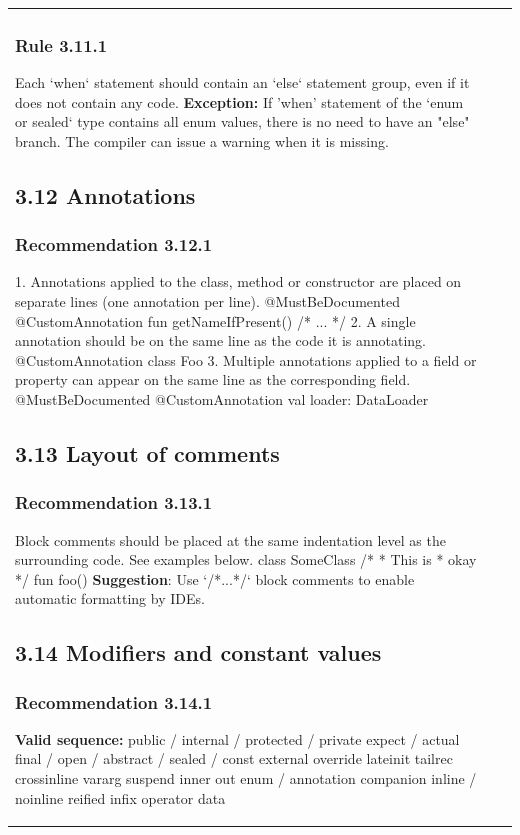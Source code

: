 \begin{center}
\begin{tabular}{ |p{}|p{}|p{}| }
{{{{{\subsubsection*{\textbf{Rule 3.11.1}}
Each `when` statement should contain an `else` statement group, even if it does not contain any code.
\textbf{Exception:} If 'when' statement of the `enum or sealed` type contains all enum values, there is no need to have an "else" branch.
The compiler can issue a warning when it is missing.
\subsection*{\textbf{3.12 Annotations}}
\subsubsection*{\textbf{Recommendation 3.12.1}}
1. Annotations applied to the class, method or constructor are placed on separate lines (one annotation per line).
@MustBeDocumented
@CustomAnnotation
fun getNameIfPresent() { /* ... */ }
2. A single annotation should be on the same line as the code it is annotating.
@CustomAnnotation class Foo {}
3. Multiple annotations applied to a field or property can appear on the same line as the corresponding field.
@MustBeDocumented @CustomAnnotation val loader: DataLoader
\subsection*{\textbf{3.13 Layout of comments}}
\subsubsection*{\textbf{Recommendation 3.13.1}}
Block comments should be placed at the same indentation level as the surrounding code. See examples below.
class SomeClass {
     /*
      * This is
      * okay
      */
      fun foo() {}
}
\textbf{Suggestion}: Use `/*...*/` block comments to enable automatic formatting by IDEs.
\subsection*{\textbf{3.14 Modifiers and constant values}}
\subsubsection*{\textbf{Recommendation 3.14.1}}
\textbf{Valid sequence:}
public / internal / protected / private
expect / actual
final / open / abstract / sealed / const
external
override
lateinit
tailrec
crossinline
vararg
suspend
inner
out
enum / annotation
companion
inline / noinline
reified
infix
operator
data
}}}}}
\end{tabular}
\end{center}
